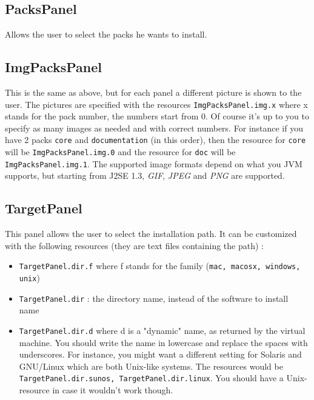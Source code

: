 \subsection{PacksPanel}

Allows the user to select the packs he wants to install.\\

\subsection{ImgPacksPanel}

This is the same as above, but for each panel a different picture is
shown to the user. The pictures are specified with the resources
\texttt{ImgPacksPanel.img.x} where x stands for the pack number, the
numbers start from 0. Of course it's up to you to specify as many images
as needed and with correct numbers. For instance if you have 2 packs
\texttt{core} and \texttt{documentation} (in this order), then the resource for
\texttt{core} will be \texttt{ImgPacksPanel.img.0} and the resource for
\texttt{doc} will be \texttt{ImgPacksPanel.img.1}. The supported image formats
depend on what you JVM supports, but starting from J2SE 1.3, \textsl{GIF},
\textsl{JPEG} and \textsl{PNG} are supported.\\

\subsection{TargetPanel}

This panel allows the user to select the installation path. It can be customized with
the following resources (they are text files containing the path) :
\begin{itemize}

  \item \texttt{TargetPanel.dir.f} where f stands for the family (\texttt{mac,
  macosx, windows, unix})
  \item \texttt{TargetPanel.dir} : the directory name, instead of the software
  to install name
  \item \texttt{TargetPanel.dir.d} where d is a "dynamic" name, as returned by
  the \Java virtual machine. You should write the name in lowercase and replace the
  spaces with underscores. For instance, you might want a different setting for
  Solaris and GNU/Linux which are both Unix-like systems. The resources would be
  \texttt{TargetPanel.dir.sunos, TargetPanel.dir.linux}. You should have a
  Unix-resource in case it wouldn't work though.

\end{itemize}\

